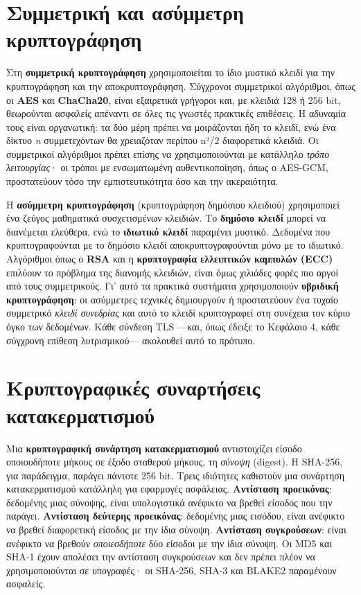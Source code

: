 \documentclass[11pt,openany]{book}
\begin{document}
\section{Συμμετρική και ασύμμετρη κρυπτογράφηση}\label{sec:7.1}
Στη \textbf{συμμετρική κρυπτογράφηση} χρησιμοποιείται το ίδιο μυστικό κλειδί για την κρυπτογράφηση και την αποκρυπτογράφηση. Σύγχρονοι συμμετρικοί αλγόριθμοι, όπως οι \textbf{AES} και \textbf{ChaCha20}, είναι εξαιρετικά γρήγοροι και, με κλειδιά 128 ή 256 bit, θεωρούνται ασφαλείς απέναντι σε όλες τις γνωστές πρακτικές επιθέσεις. Η αδυναμία τους είναι οργανωτική: τα δύο μέρη πρέπει να μοιράζονται ήδη το κλειδί, ενώ ένα δίκτυο \emph{n} συμμετεχόντων θα χρειαζόταν περίπου n²/2 διαφορετικά κλειδιά. Οι συμμετρικοί αλγόριθμοι πρέπει επίσης να χρησιμοποιούνται με κατάλληλο \emph{τρόπο λειτουργίας}· οι τρόποι με ενσωματωμένη αυθεντικοποίηση, όπως ο AES-GCM, προστατεύουν τόσο την εμπιστευτικότητα όσο και την ακεραιότητα.

Η \textbf{ασύμμετρη κρυπτογράφηση} (κρυπτογράφηση δημόσιου κλειδιού) χρησιμοποιεί ένα ζεύγος μαθηματικά συσχετισμένων κλειδιών. Το \textbf{δημόσιο κλειδί} μπορεί να διανέμεται ελεύθερα, ενώ το \textbf{ιδιωτικό κλειδί} παραμένει μυστικό. Δεδομένα που κρυπτογραφούνται με το δημόσιο κλειδί αποκρυπτογραφούνται μόνο με το ιδιωτικό. Αλγόριθμοι όπως ο \textbf{RSA} και η \textbf{κρυπτογραφία ελλειπτικών καμπυλών (ECC)} επιλύουν το πρόβλημα της διανομής κλειδιών, είναι όμως χιλιάδες φορές πιο αργοί από τους συμμετρικούς. Γι' αυτό τα πρακτικά συστήματα χρησιμοποιούν \textbf{υβριδική κρυπτογράφηση}: οι ασύμμετρες τεχνικές δημιουργούν ή προστατεύουν ένα τυχαίο συμμετρικό \emph{κλειδί συνεδρίας} και αυτό το κλειδί κρυπτογραφεί στη συνέχεια τον κύριο όγκο των δεδομένων. Κάθε σύνδεση TLS —και, όπως έδειξε το Κεφάλαιο 4, κάθε σύγχρονη επίθεση λυτρισμικού— ακολουθεί αυτό το πρότυπο.

\section{Κρυπτογραφικές συναρτήσεις κατακερματισμού}\label{sec:7.2}
Μια \textbf{κρυπτογραφική συνάρτηση κατακερματισμού} αντιστοιχίζει είσοδο οποιουδήποτε μήκους σε έξοδο σταθερού μήκους, τη \emph{σύνοψη} (digest). Η SHA-256, για παράδειγμα, παράγει πάντοτε 256 bit. Τρεις ιδιότητες καθιστούν μια συνάρτηση κατακερματισμού κατάλληλη για εφαρμογές ασφάλειας. \textbf{Αντίσταση προεικόνας}: δεδομένης μιας σύνοψης, είναι υπολογιστικά ανέφικτο να βρεθεί είσοδος που την παράγει. \textbf{Αντίσταση δεύτερης προεικόνας}: δεδομένης μιας εισόδου, είναι ανέφικτο να βρεθεί διαφορετική είσοδος με την ίδια σύνοψη. \textbf{Αντίσταση συγκρούσεων}: είναι ανέφικτο να βρεθούν \emph{οποιεσδήποτε} δύο είσοδοι με την ίδια σύνοψη. Οι MD5 και SHA-1 έχουν απολέσει την αντίσταση συγκρούσεων και δεν πρέπει πλέον να χρησιμοποιούνται σε υπογραφές· οι SHA-256, SHA-3 και BLAKE2 παραμένουν ασφαλείς.
\end{document}
